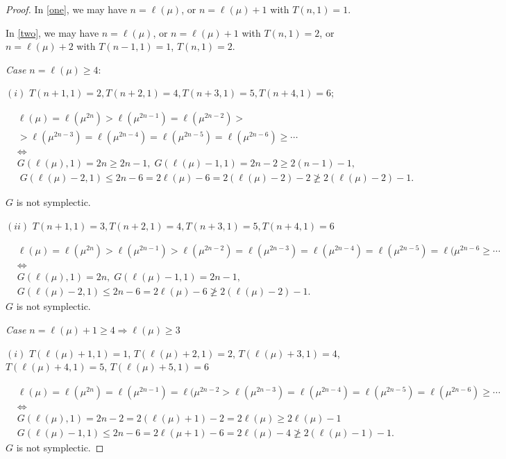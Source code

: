 \documentclass[reqno]{amsart}
\theoremstyle{tplain}
\begin{document}
{\begin{proof}
In \eqref{one}, we may have $n=\ell(\mu)$, or $n=\ell(\mu)+1$ with $T(n,1)=1$.

In \eqref{two}, we may have $n=\ell(\mu)$, or $n=\ell(\mu)+1$ with $T(n,1)=2$, or $n=\ell(\mu)+2$ with $T(n-1,1)=1$, $T(n,1)=2$.

\medskip
\emph{Case $n=\ell(\mu)\ge 4$}:

$(i)$ $T(n+1,1)=2, T(n+2,1)=4, T(n+3,1)=5, T(n+4,1)=6$;

\begin{align*}&\ell(\mu)=\ell(\mu^{2n})>\ell(\mu^{2n-1})=\ell(\mu^{2n-2})>\nonumber
\\
&>\ell(\mu^{2n-3})=\ell(\mu^{2n-4})=\ell(\mu^{2n-5})=\ell(\mu^{2n-6})\ge\cdots\nonumber \\
&\Leftrightarrow\\
&G(\ell(\mu),1)=2n\ge 2n-1,\; G(\ell(\mu)-1,1)=2n-2\ge 2(n-1)-1,\\
&\;G(\ell(\mu)-2,1)\le 2n-6=2\ell(\mu)-6=2(\ell(\mu)-2)-2\ngeq 2(\ell(\mu)-2)-1.
\end{align*}

$G$ is not symplectic.

\medskip
$(ii)$ $T(n+1,1)=3, T(n+2,1)=4, T(n+3,1)=5, T(n+4,1)=6$

\begin{align*}&\ell(\mu)=\ell(\mu^{2n})>\ell(\mu^{2n-1})>\ell(\mu^{2n-2})=
\ell(\mu^{2n-3})=\ell(\mu^{2n-4})=\ell(\mu^{2n-5})=\ell(\mu^{2n-6}\ge\cdots\nonumber \\
&\Leftrightarrow \\
&G(\ell(\mu),1)=2n, \; G(\ell(\mu)-1,1)=2n-1,\\
&G(\ell(\mu)-2,1)\le 2n-6=2\ell(\mu)-6\ngeq 2(\ell(\mu)-2)-1.
\end{align*}
$G$ is not symplectic.

\medskip
\emph{Case $n=\ell(\mu)+1\ge 4\Rightarrow\ell(\mu)\ge 3 $}

$(i)$ $T(\ell(\mu)+1,1)=1$, $T(\ell(\mu)+2,1)=2$,
$T(\ell(\mu)+3,1)=4$, $T(\ell(\mu)+4,1)=5$, $T(\ell(\mu)+5,1)=6$

 \begin{align*}&\ell(\mu)=\ell(\mu^{2n})=\ell(\mu^{2n-1})=\ell(\mu^{2n-2}>
\ell(\mu^{2n-3})=\ell(\mu^{2n-4})=\ell(\mu^{2n-5})=\ell(\mu^{2n-6})\ge\cdots\nonumber \\
&\Leftrightarrow\\
&G(\ell(\mu),1)=2n-2=2(\ell(\mu)+1)-2=2\ell(\mu)\ge 2\ell(\mu)-1\\
 &G(\ell(\mu)-1,1)\le 2n-6=2\ell(\mu+1)-6=2\ell(\mu)-4\ngeq 2(\ell(\mu)-1)-1.
\end{align*}
$G$ is not symplectic.


\end{proof}}
\end{document}
